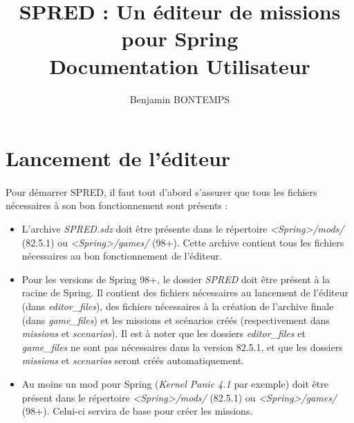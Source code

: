 \documentclass[a4paper]{article}
\title{SPRED : Un éditeur de missions pour Spring\\ Documentation Utilisateur}
\author{Benjamin BONTEMPS}
\begin{document}
\maketitle

\tableofcontents

\newpage

\section{Lancement de l'éditeur}
\paragraph{ }
Pour démarrer SPRED, il faut tout d'abord s'assurer que tous les fichiers nécessaires à son bon fonctionnement sont présents :
\begin{itemize}
\item L'archive \textit{SPRED.sdz} doit être présente dans le répertoire \textit{<Spring>/mods/} (82.5.1) ou \textit{<Spring>/games/} (98+). Cette archive contient tous les fichiers nécessaires au bon fonctionnement de l'éditeur.
\item Pour les versions de Spring 98+, le dossier \textit{SPRED} doit être présent à la racine de Spring. Il contient des fichiers nécessaires au lancement de l'éditeur (dans \textit{editor\_files}), des fichiers nécessaires à la création de l'archive finale (dans \textit{game\_files}) et les missions et scénarios créés (respectivement dans \textit{missions} et \textit{scenarios}). Il est à noter que les dossiers \textit{editor\_files} et \textit{game\_files} ne sont pas nécessaires dans la version 82.5.1, et que les dossiers \textit{missions} et \textit{scenarios} seront créés automatiquement.
\item Au moins un mod pour Spring (\textit{Kernel Panic 4.1} par exemple) doit être présent dans le répertoire \textit{<Spring>/mods/} (82.5.1) ou \textit{<Spring>/games/} (98+). Celui-ci servira de base pour créer les missions.
\end{itemize}
\end{document}
